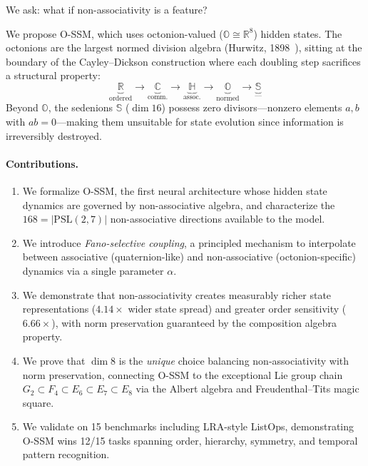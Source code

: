 \documentclass{article}
\newcommand{\Oct}{\mathbb{O}}
\newcommand{\R}{\mathbb{R}}
\newcommand{\C}{\mathbb{C}}
\newcommand{\HH}{\mathbb{H}}
\newcommand{\Sed}{\mathbb{S}}
\begin{document}
We ask: what if non-associativity is a feature?

We propose O-SSM, which uses octonion-valued ($\Oct \cong \R^8$) hidden states.
The octonions are the largest normed division algebra (Hurwitz, 1898~\cite{hurwitz1898composition}), sitting at the boundary of the Cayley--Dickson construction where each doubling step sacrifices a structural property:
\begin{equation}
\underbrace{\R}_{\text{ordered}} \to \underbrace{\C}_{\text{comm.}} \to \underbrace{\HH}_{\text{assoc.}} \to \underbrace{\Oct}_{\text{normed}} \to \underbrace{\Sed}_{\text{---}}
\end{equation}
Beyond $\Oct$, the sedenions $\Sed$ ($\dim 16$) possess zero divisors---nonzero elements $a,b$ with $ab=0$---making them unsuitable for state evolution since information is irreversibly destroyed.

\paragraph{Contributions.}
\begin{enumerate}
    \item We formalize O-SSM, the first neural architecture whose hidden state dynamics are governed by non-associative algebra, and characterize the $168 = |\mathrm{PSL}(2,7)|$ non-associative directions available to the model.
    \item We introduce \emph{Fano-selective coupling}, a principled mechanism to interpolate between associative (quaternion-like) and non-associative (octonion-specific) dynamics via a single parameter $\alpha$.
    \item We demonstrate that non-associativity creates measurably richer state representations ($4.14\times$ wider state spread) and greater order sensitivity ($6.66\times$), with norm preservation guaranteed by the composition algebra property.
    \item We prove that $\dim 8$ is the \emph{unique} choice balancing non-associativity with norm preservation, connecting O-SSM to the exceptional Lie group chain $G_2 \subset F_4 \subset E_6 \subset E_7 \subset E_8$ via the Albert algebra and Freudenthal--Tits magic square.
    \item We validate on 15 benchmarks including LRA-style ListOps, demonstrating O-SSM wins 12/15 tasks spanning order, hierarchy, symmetry, and temporal pattern recognition.
\end{enumerate}
\end{document}
